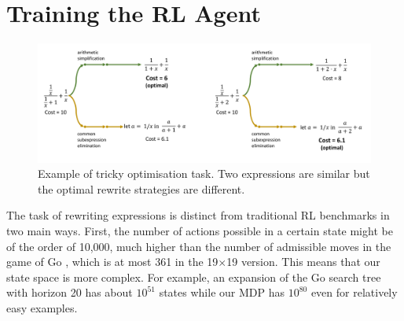 \documentclass[fullpage,twocolumn]{article} %
\begin{document}
\section{Training the RL Agent}
\label{sec-training}

\begin{figure}[t!]
  \centering
  \includegraphics[width=1.0\textwidth]{tricky-expression.pdf}
  \caption{Example of tricky optimisation task. Two expressions are similar but the optimal rewrite strategies are different.}
  \label{trickey-example}
\end{figure}


The task of rewriting expressions is distinct from traditional RL benchmarks in two main ways. First, the number of actions possible in a certain state might be of the order of 10,000, much higher than the number of admissible moves in the game of Go \citep{Silver2016, silver2017mastering}, which is at most 361 in the 19$\times$19 version. This means that our state space is more complex. For example, an expansion of the Go search tree with horizon 20 has about $10^{51}$ states while our MDP has $10^{80}$ even for relatively easy examples. 
\end{document}
